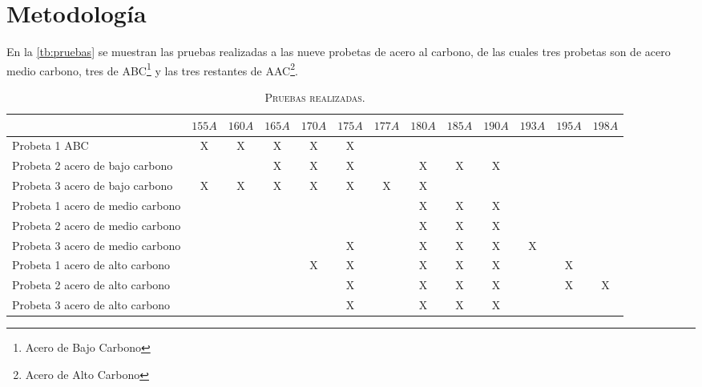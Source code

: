 \section{Metodología}

En la \autoref{tb:pruebas} se muestran las pruebas realizadas a las nueve probetas de acero al carbono, de las cuales tres probetas son de acero medio carbono, tres de ABC\footnote{Acero de Bajo Carbono} y las tres restantes de AAC\footnote{Acero de Alto Carbono}.  





\begin{table}[!h]
	\renewcommand{\arraystretch}{1.4} %
	\caption{\textsc{Pruebas realizadas.}} %
	\label{tb:pruebas}
	\centering
	\resizebox{15cm}{!} {
		\begin{tabular}{lcccccccccccc}
			\bfseries  & \bfseries $155 A$ & \bfseries $160 A$ & \bfseries $165 A$ & \bfseries $170 A$ & \bfseries $175 A$ & \bfseries $177 A$ & \bfseries $180 A$ & \bfseries $185 A$ & \bfseries $190 A$ & \bfseries $193 A$ & \bfseries $195 A$ & \bfseries $198 A$\\
			\toprule
			
			Probeta 1 ABC & X	&X	&X &X &X	& & & & & & &\\
			
			Probeta 2 acero de bajo carbono  & 	&	&X &X &X &	&X  &X &X & & &\\
			
			Probeta 3 acero de bajo carbono & X	&X	&X &X &X &X &X	&  & & & &\\
			
			Probeta 1 acero de medio carbono & 	& &	& & &  & X &X &X	& & & \\
			
			Probeta 2 acero de medio carbono& &	&	& & &	&  X &X &X & & &\\
			
			Probeta 3 acero de medio carbono	& 	&	& & &X & &X	&X &X & X & &\\
			
			Probeta 1 acero de alto carbono	& 	&	& &X	&X & &X &X &X & &X &\\
			
			Probeta 2 acero de alto carbono	& 	&	& & &X	& &X	&X &X & &X &X \\
			
			Probeta 3 acero de alto carbono	& 	&	& & &	X &	&X	&X &X  & & &\\
			
			\bottomrule
			
		\end{tabular}
	}
\end{table}


